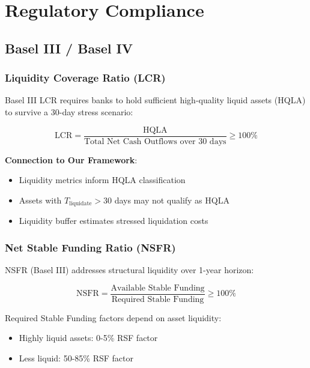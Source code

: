 \documentclass[11pt,a4paper]{article}
\begin{document}
\section{Regulatory Compliance}

\subsection{Basel III / Basel IV}

\subsubsection{Liquidity Coverage Ratio (LCR)}

Basel III LCR requires banks to hold sufficient high-quality liquid assets (HQLA) to survive a 30-day stress scenario:

\begin{equation}
\text{LCR} = \frac{\text{HQLA}}{\text{Total Net Cash Outflows over 30 days}} \geq 100\%
\end{equation}

\textbf{Connection to Our Framework}:
\begin{itemize}
    \item Liquidity metrics inform HQLA classification
    \item Assets with $T_{\text{liquidate}} > 30$ days may not qualify as HQLA
    \item Liquidity buffer estimates stressed liquidation costs
\end{itemize}

\subsubsection{Net Stable Funding Ratio (NSFR)}

NSFR (Basel III) addresses structural liquidity over 1-year horizon:

\begin{equation}
\text{NSFR} = \frac{\text{Available Stable Funding}}{\text{Required Stable Funding}} \geq 100\%
\end{equation}

Required Stable Funding factors depend on asset liquidity:
\begin{itemize}
    \item Highly liquid assets: 0-5\% RSF factor
    \item Less liquid: 50-85\% RSF factor
\end{itemize}
\end{document}

